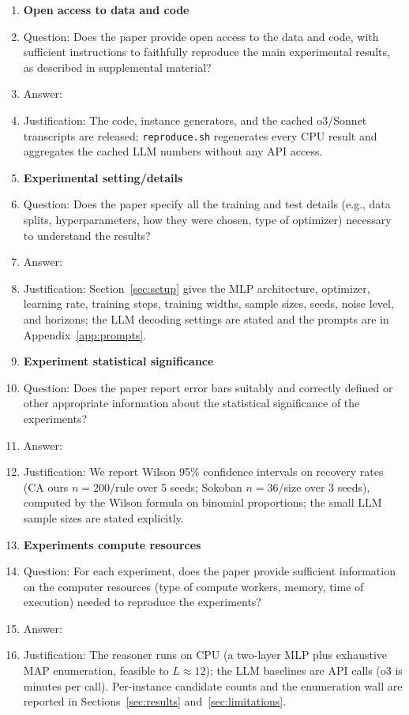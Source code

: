 \begin{enumerate}
\item {\bf Open access to data and code}
    \item[] Question: Does the paper provide open access to the data and code, with sufficient instructions to faithfully reproduce the main experimental results, as described in supplemental material?
    \item[] Answer: \answerYes{}
    \item[] Justification: The code, instance generators, and the cached o3/Sonnet transcripts are released; \texttt{reproduce.sh} regenerates every CPU result and aggregates the cached LLM numbers without any API access.

\item {\bf Experimental setting/details}
    \item[] Question: Does the paper specify all the training and test details (e.g., data splits, hyperparameters, how they were chosen, type of optimizer) necessary to understand the results?
    \item[] Answer: \answerYes{}
    \item[] Justification: Section~\ref{sec:setup} gives the MLP architecture, optimizer, learning rate, training steps, training widths, sample sizes, seeds, noise level, and horizons; the LLM decoding settings are stated and the prompts are in Appendix~\ref{app:prompts}.

\item {\bf Experiment statistical significance}
    \item[] Question: Does the paper report error bars suitably and correctly defined or other appropriate information about the statistical significance of the experiments?
    \item[] Answer: \answerYes{}
    \item[] Justification: We report Wilson 95\% confidence intervals on recovery rates (CA ours $n{=}200$/rule over 5 seeds; Sokoban $n{=}36$/size over 3 seeds), computed by the Wilson formula on binomial proportions; the small LLM sample sizes are stated explicitly.

\item {\bf Experiments compute resources}
    \item[] Question: For each experiment, does the paper provide sufficient information on the computer resources (type of compute workers, memory, time of execution) needed to reproduce the experiments?
    \item[] Answer: \answerYes{}
    \item[] Justification: The reasoner runs on CPU (a two-layer MLP plus exhaustive MAP enumeration, feasible to $L\approx 12$); the LLM baselines are API calls (o3 is minutes per call). Per-instance candidate counts and the enumeration wall are reported in Sections~\ref{sec:results} and~\ref{sec:limitations}.


\end{enumerate}
